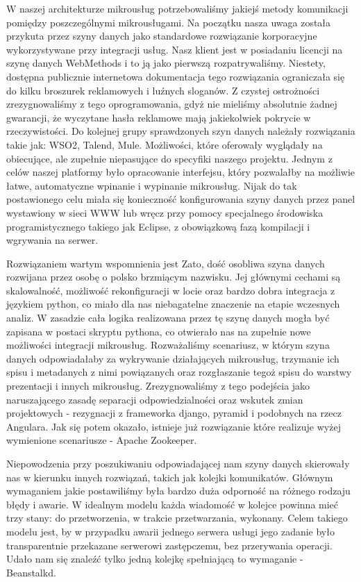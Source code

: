 \documentclass[licencjacka]{pracamgr}
\begin{document}
W naszej architekturze mikrousług potrzebowaliśmy jakiejś metody komunikacji pomiędzy poszczególnymi mikrousługami.
Na początku nasza uwaga została przykuta przez szyny danych jako standardowe rozwiązanie korporacyjne wykorzystywane
przy integracji usług. Nasz klient jest w posiadaniu licencji na szynę danych WebMethods i to ją jako pierwszą
rozpatrywaliśmy. Niestety, dostępna publicznie internetowa dokumentacja tego rozwiązania ograniczała się do kilku
broszurek reklamowych i luźnych sloganów. Z czystej ostrożności zrezygnowaliśmy z tego oprogramowania, gdyż nie
mieliśmy absolutnie żadnej gwarancji, że wyczytane hasła reklamowe mają jakiekolwiek pokrycie w rzeczywistości.
Do kolejnej grupy sprawdzonych szyn danych należały rozwiązania takie jak: WSO2, Talend, Mule. Możliwości, które
oferowały wyglądały na obiecujące, ale zupełnie niepasujące do specyfiki naszego projektu. Jednym z celów naszej
platformy było opracowanie interfejsu, który pozwalałby na możliwie łatwe, automatyczne wpinanie i wypinanie
mikrousług. Nijak do tak postawionego celu miała się konieczność konfigurowania szyny danych przez panel wystawiony w sieci
WWW lub wręcz przy pomocy specjalnego środowiska programistycznego takiego jak Eclipse, z obowiązkową fazą kompilacji
i wgrywania na serwer. 

Rozwiązaniem wartym wspomnienia jest Zato, dość osobliwa szyna danych rozwijana przez osobę o polsko brzmiącym nazwisku. Jej głównymi cechami są skalowalność, możliwość rekonfiguracji w locie oraz bardzo dobra integracja z językiem python, co miało dla nas niebagatelne znaczenie na etapie wczesnych analiz. W zasadzie cała logika realizowana przez tę szynę danych mogła być zapisana w postaci skryptu pythona, co otwierało nas na zupełnie nowe możliwości integracji mikrousług. Rozważaliśmy scenariusz, w którym szyna danych odpowiadałaby za wykrywanie działających mikrousług, trzymanie ich spisu i metadanych z nimi powiązanych oraz rozgłaszanie tegoż spisu do warstwy prezentacji i innych mikrousług. Zrezygnowaliśmy z tego podejścia jako naruszającego zasadę separacji odpowiedzialności oraz wskutek zmian projektowych - rezygnacji z frameworka django, pyramid i podobnych na rzecz Angulara. Jak się potem okazało, istnieje już rozwiązanie które realizuje wyżej wymienione scenariusze - Apache Zookeeper.

Niepowodzenia przy poszukiwaniu odpowiadającej nam szyny danych skierowały nas w kierunku innych rozwiązań, takich jak
kolejki komunikatów. Głównym wymaganiem jakie postawiliśmy była bardzo duża odporność na różnego rodzaju błędy i
awarie. W idealnym modelu każda wiadomość w kolejce powinna mieć trzy stany: do przetworzenia, w trakcie przetwarzania, wykonany. Celem takiego modelu jest, by w przypadku awarii jednego serwera usługi jego zadanie było transparentnie przekazane serwerowi zastępczemu, bez przerywania operacji. Udało nam się znaleźć tylko jedną kolejkę spełniającą to wymaganie - Beanstalkd.
\end{document}
